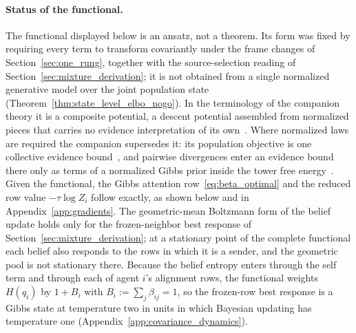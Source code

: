 \paragraph{Status of the functional.} The functional displayed below is an ansatz, not a theorem. Its form was fixed by requiring every term to transform covariantly under the frame changes of Section~\ref{sec:one_rung}, together with the source-selection reading of Section~\ref{sec:mixture_derivation}; it is not obtained from a single normalized generative model over the joint population state (Theorem~\ref{thm:state_level_elbo_nogo}). In the terminology of the companion theory it is a composite potential, a descent potential assembled from normalized pieces that carries no evidence interpretation of its own~\cite[Ch.~12]{DennisGaugeVFE2026}. Where normalized laws are required the companion supersedes it: its population objective is one collective evidence bound~\cite[Ch.~5]{DennisGaugeVFE2026}, and pairwise divergences enter an evidence bound there only as terms of a normalized Gibbs prior inside the tower free energy~\cite[Ch.~12]{DennisGaugeVFE2026}. Given the functional, the Gibbs attention row~\eqref{eq:beta_optimal} and the reduced row value $-\tau \log Z_i$ follow exactly, as shown below and in Appendix~\ref{app:gradients}. The geometric-mean Boltzmann form of the belief update holds only for the frozen-neighbor best response of Section~\ref{sec:mixture_derivation}; at a stationary point of the complete functional each belief also responds to the rows in which it is a sender, and the geometric pool is not stationary there. Because the belief entropy enters through the self term and through each of agent $i$'s alignment rows, the functional weights $H(q_i)$ by $1 + B_i$ with $B_i := \sum_j \beta_{ij} = 1$, so the frozen-row best response is a Gibbs state at temperature two in units in which Bayesian updating has temperature one (Appendix~\ref{app:covariance_dynamics}).

